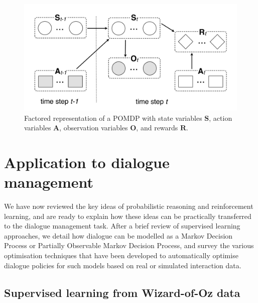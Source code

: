 \begin{figure}[ht]
\centering
\includegraphics[scale=0.25]{imgs/pomdp3.pdf}
\caption{Factored representation of a POMDP with state variables $\mathbf{S}$, action variables $\mathbf{A}$, observation variables $\mathbf{O}$, and rewards $\mathbf{R}$. }
\label{fig:pomdp3}
\end{figure}

\section{Application to dialogue management}
\label{sec:application-dm}

We have now reviewed the key ideas of probabilistic reasoning and reinforcement learning, and are ready to explain how these ideas can be practically transferred to the dialogue management task.  After a brief review of supervised learning approaches, we detail how dialogue can be modelled as a Markov Decision Process or Partially Observable Markov Decision Process, and survey the various optimisation techniques that have been developed to automatically optimise dialogue policies for such models based on real or simulated interaction data.  

\subsection{Supervised learning from Wizard-of-Oz data}

